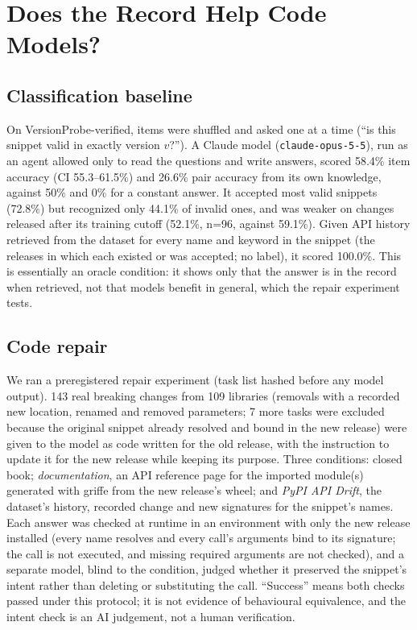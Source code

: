 \documentclass[10pt,twocolumn,letterpaper]{article}
\begin{document}
\section{Does the Record Help Code Models?}\label{sec:models}
\subsection{Classification baseline}
On VersionProbe-verified, items were shuffled and asked one at a time (``is this snippet valid in exactly version
$v$?''). A Claude model (\texttt{claude-opus-5-5}), run as an agent allowed only to read the questions and write
answers, scored 58.4\% item accuracy (CI 55.3--61.5\%) and 26.6\% pair accuracy from its own
knowledge, against 50\% and 0\% for a constant answer. It accepted most valid snippets (72.8\%) but recognized
only 44.1\% of invalid ones, and was weaker on changes released after its training cutoff (52.1\%,
n=96, against 59.1\%). Given API history retrieved from the dataset for every name and keyword
in the snippet (the releases in which each existed or was accepted; no label), it scored 100.0\%. This is
essentially an oracle condition: it shows only that the answer is in the record when retrieved, not that models
benefit in general, which the repair experiment tests.

\subsection{Code repair}
We ran a preregistered repair experiment (task list hashed before any model output). 143 real breaking changes
from 109 libraries (removals with a recorded new location, renamed and removed parameters; 7 more tasks were
excluded because the original snippet already resolved and bound in the new release) were given to the model as code
written for the old release, with the instruction to update it for the new release while keeping its purpose. Three
conditions: closed book; \emph{documentation}, an API reference page for the imported module(s) generated with griffe
from the new release's wheel; and \emph{PyPI API Drift}, the dataset's history, recorded change and new signatures for
the snippet's names. Each answer was checked at runtime in an environment with only the new release installed (every
name resolves and every call's arguments bind to its signature; the call is not executed, and missing required
arguments are not checked), and a separate model, blind to the condition, judged whether it preserved the snippet's
intent rather than deleting or substituting the call. ``Success'' means both checks passed under this protocol; it is
not evidence of behavioural equivalence, and the intent check is an AI judgement, not a human verification.
\end{document}
